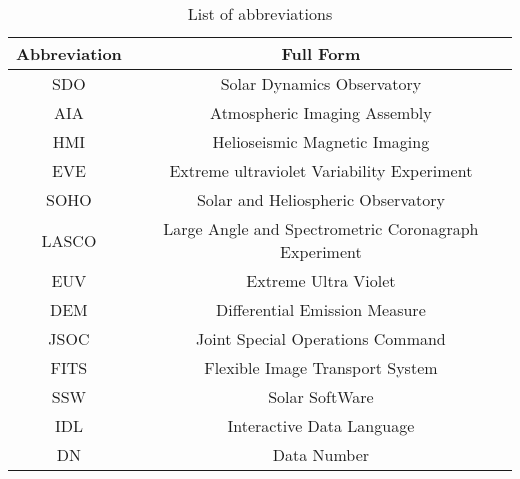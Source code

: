 
\setcounter{page}{1}
\begin{table*}[h!]
    \centering
    \setlength{\tabcolsep}{10pt}
    \renewcommand{\arraystretch}{1.5}
    \begin{tabular}{ | c | c | }
      \hline
      \textbf{Abbreviation} & \textbf{Full Form} \\
      \hline
      SDO & Solar Dynamics Observatory \\
      AIA & Atmospheric Imaging Assembly \\
      HMI & Helioseismic Magnetic Imaging \\
      EVE & Extreme ultraviolet Variability Experiment \\
      SOHO & Solar and Heliospheric Observatory \\
      LASCO & Large Angle and Spectrometric Coronagraph Experiment \\
      EUV & Extreme Ultra Violet \\
      DEM & Differential Emission Measure \\
      JSOC & Joint Special Operations Command \\
      FITS & Flexible Image Transport System \\
      SSW & Solar SoftWare \\
      IDL & Interactive Data Language \\
      DN & Data Number \\
      \hline
    \end{tabular}
    \caption{List of abbreviations}
    \label{table:abbr}
\end{table*}


